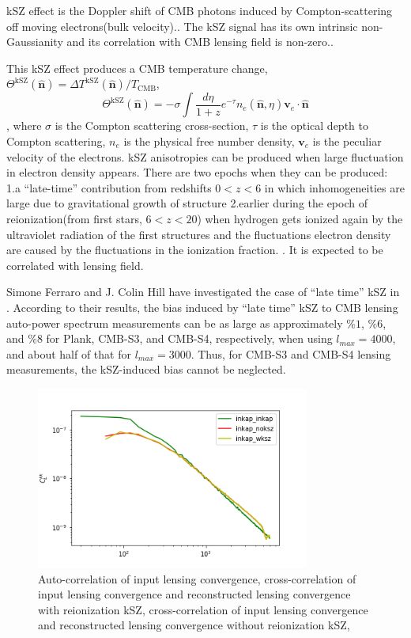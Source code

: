\documentclass[12pt, notitlepage, onecolumn, amsmath, amssymb, aps]{revtex4-1}
\begin{document}
kSZ effect is the Doppler shift of CMB photons induced by Compton-scattering off moving electrons(bulk velocity).\cite{Ferraro:2017fac}. The kSZ signal has its own intrinsic non-Gaussianity and its correlation with CMB lensing field is non-zero.\cite{Smith:2016lnt}.

This kSZ effect produces a CMB temperature change, \(\Theta^{\mathrm{kSZ}}(\hat{\mathbf{n}})=\Delta T^{\mathrm{kSZ}}(\hat{\mathbf{n}}) / T_{\mathrm{CMB}}\),
\begin{equation}
  \Theta^{\mathrm{kSZ}}(\hat{\mathbf{n}})=-\sigma \int \frac{d \eta}{1+z} e^{-\tau} n_{e}(\hat{\mathbf{n}}, \eta) \mathbf{v}_{e} \cdot \hat{\mathbf{n}}
\end{equation} \cite{Ferraro:2017fac},
where \(\sigma\) is the Compton scattering cross-section, \(\tau\) is the optical depth to Compton scattering, \(n_{e}\) is the physical free number density, \(\mathbf{v}_{e}\) is the peculiar velocity of the electrons.
kSZ anisotropies can be produced when large fluctuation in electron density appears. There are two epochs when they can be produced: 1.a ``late-time'' contribution from redshifts \(0<z<6\) in which inhomogeneities are large due to gravitational growth of structure 2.earlier during the epoch of reionization(from first stars, \(6<z<20\)) when hydrogen gets ionized again by the ultraviolet radiation of the first structures and the fluctuations electron density are caused by the fluctuations in the ionization fraction.\cite{Ferraro:2017fac} \cite{Alvarez:2015xzu}. It is expected to be correlated with lensing field.

Simone Ferraro and J. Colin Hill  have investigated the case of ``late time'' kSZ in \cite{Ferraro:2017fac}. According to their results, the bias induced by ``late time'' kSZ to CMB lensing auto-power spectrum measurements can be as large as approximately \(\%1\), \(\%6\), and \(\%8\) for Plank, CMB-S3, and CMB-S4, respectively, when using \(l_{max} = 4000\), and about half of that for \(l_{max} = 3000\). Thus, for CMB-S3 and CMB-S4 lensing measurements, the kSZ-induced bias cannot be neglected.

\begin{figure}[h]
\includegraphics[width=0.8\textwidth]{cross_correlation3.png}
\caption{Auto-correlation of input lensing convergence, cross-correlation of input lensing convergence and reconstructed lensing convergence with reionization kSZ, cross-correlation of input lensing convergence and reconstructed lensing convergence without reionization kSZ, }
\end{figure}
\end{document}
